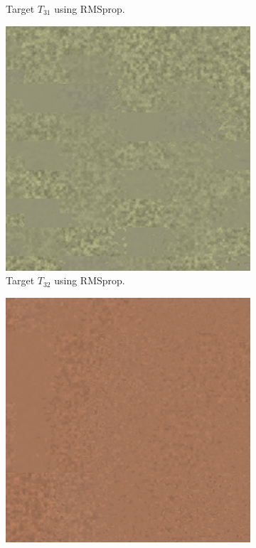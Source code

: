 \begin{figure}[hpt]
\begin{subfigure}[t]{.25\textwidth}
    \caption{Target $T_{31}$ using RMSprop.}
    \label{fig:M3SBLFinalRendersTwoParamRMSprop}
\end{subfigure}\hspace{0.7cm}
\begin{subfigure}[t]{.25\textwidth}
    \centering
    \includegraphics[width=\linewidth]{img/evaluation/M3/random/SBL_RMSprop_random_final.png}
    \caption{Target $T_{32}$ using RMSprop.}
    \label{fig:M3SBLFinalRendersRandomRMSprop}
\end{subfigure}\hspace{0.7cm}
\begin{subfigure}[t]{.25\textwidth}
    \centering
\includegraphics[width=\linewidth]{img/evaluation/M3/real life/SBL_RMSprop_real_life_final.png}

\end{subfigure}
\end{figure}
